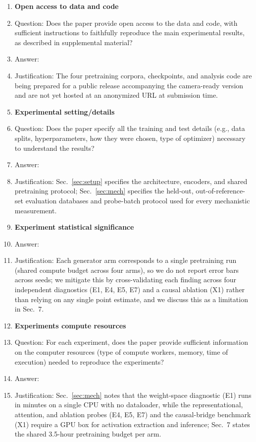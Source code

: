 \begin{enumerate}
\item {\bf Open access to data and code}
    \item[] Question: Does the paper provide open access to the data and code, with sufficient instructions to faithfully reproduce the main experimental results, as described in supplemental material?
    \item[] Answer: \answerNo{}
    \item[] Justification: The four pretraining corpora, checkpoints, and analysis code are being prepared for a public release accompanying the camera-ready version and are not yet hosted at an anonymized URL at submission time.

\item {\bf Experimental setting/details}
    \item[] Question: Does the paper specify all the training and test details (e.g., data splits, hyperparameters, how they were chosen, type of optimizer) necessary to understand the results?
    \item[] Answer: \answerYes{}
    \item[] Justification: Sec.~\ref{sec:setup} specifies the architecture, encoders, and shared pretraining protocol; Sec.~\ref{sec:mech} specifies the held-out, out-of-reference-set evaluation databases and probe-batch protocol used for every mechanistic measurement.

\item {\bf Experiment statistical significance}
    \item[] Answer: \answerNo{}
    \item[] Justification: Each generator arm corresponds to a single pretraining run (shared compute budget across four arms), so we do not report error bars across seeds; we mitigate this by cross-validating each finding across four independent diagnostics (E1, E4, E5, E7) and a causal ablation (X1) rather than relying on any single point estimate, and we discuss this as a limitation in Sec.~7.

\item {\bf Experiments compute resources}
    \item[] Question: For each experiment, does the paper provide sufficient information on the computer resources (type of compute workers, memory, time of execution) needed to reproduce the experiments?
    \item[] Answer: \answerYes{}
    \item[] Justification: Sec.~\ref{sec:mech} notes that the weight-space diagnostic (E1) runs in minutes on a single CPU with no dataloader, while the representational, attention, and ablation probes (E4, E5, E7) and the causal-bridge benchmark (X1) require a GPU box for activation extraction and inference; Sec.~7 states the shared 3.5-hour pretraining budget per arm.


\end{enumerate}
